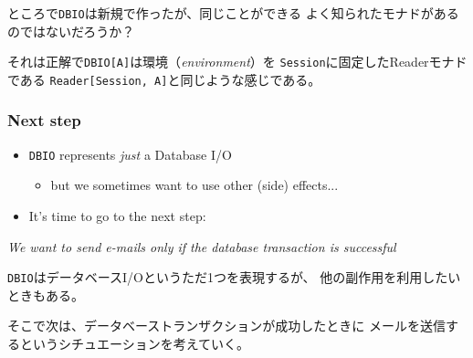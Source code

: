 \begin{frame}[fragile]
\begin{notes}
    \item ところで\lstinline|DBIO|は新規で作ったが、同じことができる
    よく知られたモナドがあるのではないだろうか？

    \item それは正解で\lstinline|DBIO[A]|は環境（\emph{environment}）を
    \lstinline|Session|に固定したReaderモナドである
    \lstinline|Reader[Session, A]|と同じような感じである。
  \end{notes}
\end{frame}

\begin{frame}
  \frametitle{Next step}

  \pause
  \begin{itemize}
    \item \lstinline|DBIO| represents \emph{just} a Database I/O
    \begin{itemize}
      \item but we sometimes want to use other (side) effects...
    \end{itemize}
  \end{itemize}

  \pause

  \pause
  \begin{itemize}
    \item It's time to go to the next step:
  \end{itemize}
  
  \begin{shadequote}{}
    \begin{center}
      \itshape\rmfamily\large
      We want to send e-mails only if the database transaction
      is successful
    \end{center}
  \end{shadequote}

  \begin{notes}
    \item \lstinline|DBIO|はデータベースI/Oというただ1つを表現するが、
    他の副作用を利用したいときもある。

    \item そこで次は、データベーストランザクションが成功したときに
    メールを送信するというシチュエーションを考えていく。
  \end{notes}
\end{frame}

